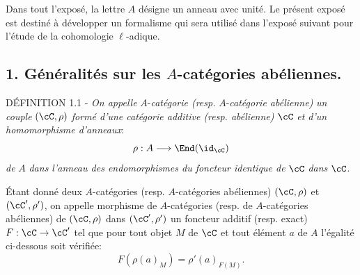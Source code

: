 Dans tout l'exposé, la lettre $A$ désigne un anneau avec unité. Le présent exposé est destiné à développer un formalisme qui sera utilisé dans l'exposé suivant pour l'étude de la cohomologie $\ell$-adique.

\subsection*{1. Généralités sur les $A$-catégories abéliennes.}

\begin{statement}{DÉFINITION 1.1}
- \emph{On appelle} $A$-\emph{catégorie (resp.} $A$-\emph{catégorie abélienne)} \emph{un couple} $(\cC,\rho)$ \emph{formé d'une catégorie additive (resp. abélienne)} $\cC$ \emph{et d'un homomorphisme d'anneaux}:
\[
\rho:A\longrightarrow \End(\id_{\cC})
\]
\emph{de} $A$ \emph{dans l'anneau des endomorphismes du foncteur identique de} $\cC$ \emph{dans} $\cC$.
\end{statement}

Étant donné deux $A$-catégories (resp. $A$-catégories abéliennes) $(\cC,\rho)$ et $(\cC',\rho')$, on appelle morphisme de $A$-catégories (resp. de $A$-catégories abéliennes) de $(\cC,\rho)$ dans $(\cC',\rho')$ un foncteur additif (resp. exact) $F:\cC\to\cC'$ tel que pour tout objet $M$ de $\cC$ et tout élément $a$ de $A$ l'égalité ci-dessous soit vérifiée:
\[
F(\rho(a)_M)=\rho'(a)_{F(M)}.
\]


